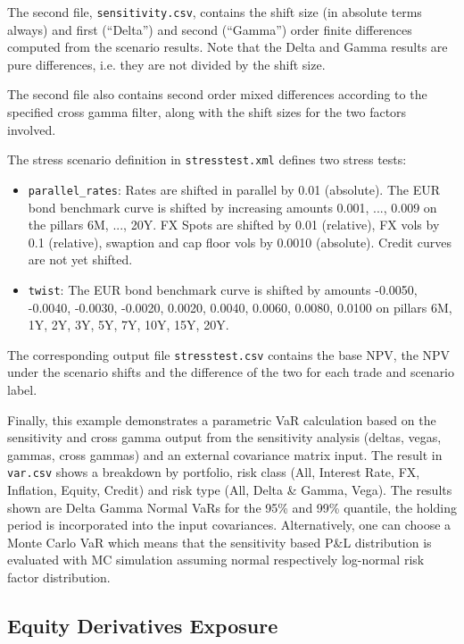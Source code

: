 The second file, {\tt sensitivity.csv}, contains the shift size (in absolute terms always) and first (``Delta'') and second
(``Gamma'') order finite differences computed from the scenario results. Note that the Delta and Gamma results are pure
differences, i.e. they are not divided by the shift size.

The second file also contains second order mixed differences according to the specified cross gamma filter, along with the shift sizes for the two factors involved.

The stress scenario definition in {\tt stresstest.xml} defines two stress tests:

\begin{itemize}
\item {\tt parallel\_rates}: Rates are shifted in parallel by 0.01 (absolute). The EUR bond benchmark curve is shifted by
  increasing amounts 0.001, ..., 0.009 on the pillars 6M, ..., 20Y. FX Spots are shifted by 0.01 (relative), FX vols by
  0.1 (relative), swaption and cap floor vols by 0.0010 (absolute).
  Credit curves are not yet shifted.
\item {\tt twist}: The EUR bond benchmark curve is shifted by amounts -0.0050, -0.0040, -0.0030, -0.0020, 0.0020,
  0.0040, 0.0060, 0.0080, 0.0100 on pillars 6M, 1Y, 2Y, 3Y, 5Y, 7Y, 10Y, 15Y, 20Y.
\end{itemize}

The corresponding output file {\tt stresstest.csv} contains the base NPV, the NPV under the scenario shifts and the
difference of the two for each trade and scenario label.

\medskip
Finally, this example demonstrates a parametric VaR calculation based on the sensitivity and cross gamma output from the sensitivity analysis (deltas, vegas, gammas, cross gammas) and an external covariance matrix input. The result in {\tt var.csv} shows a breakdown by portfolio, risk class (All, Interest Rate, FX, Inflation, Equity, Credit) and risk type (All, Delta \& Gamma, Vega). The results shown are Delta Gamma Normal VaRs for the 95\% and 99\% quantile, the holding period is incorporated into the input covariances. Alternatively, one can choose a Monte Carlo VaR which means that the sensitivity based P\&L distribution is evaluated with MC simulation assuming normal respectively log-normal risk factor distribution.

\subsection{Equity Derivatives Exposure}\label{ex:equityderivatives}

